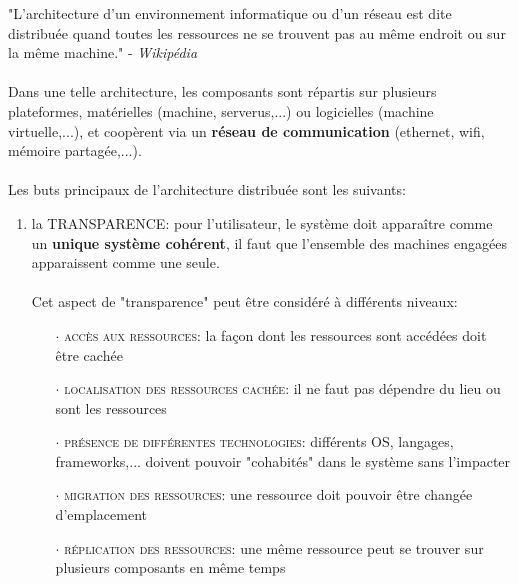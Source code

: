 \item{}
{"L’architecture d'un environnement informatique ou d'un réseau est dite distribuée quand toutes les ressources ne se trouvent pas au même endroit ou sur la même machine." - \textit{Wikipédia}
\paragraph{}
Dans une telle architecture, les composants sont répartis sur plusieurs plateformes, matérielles (machine, serverus,...) ou logicielles (machine virtuelle,...), et coopèrent via un \textbf{réseau de communication} (ethernet, wifi, mémoire partagée,...).
\paragraph{}
Les buts principaux de l'architecture distribuée sont les suivants:
\begin{enumerate}\setlength{\itemsep}{.3em}
\item la TRANSPARENCE: pour l'utilisateur, le système doit apparaître comme un \textbf{unique système cohérent}, il faut que l'ensemble des machines engagées apparaissent comme une seule. \paragraph{}Cet aspect de "transparence" peut être considéré à différents niveaux:
	\begin{itemize}\setlength{\itemsep}{.2em}
	\item[$\cdot$] \textcolor{ltred}{\textsc{accès aux ressources}}: la façon dont les ressources sont accédées doit être cachée
	\item[$\cdot$] \textcolor{ltred}{\textsc{localisation des ressources cachée}}: il ne faut pas dépendre du lieu ou sont les ressources
	\item[$\cdot$] \textcolor{ltred}{\textsc{présence de différentes technologies}}: différents OS, langages, frameworks,... doivent pouvoir "cohabités" dans le système sans l'impacter
	\item[$\cdot$] \textcolor{ltred}{\textsc{migration des ressources}}: une ressource doit pouvoir être changée d'emplacement
	\item[$\cdot$] \textcolor{ltred}{\textsc{réplication des ressources}}: une même ressource peut se trouver sur plusieurs composants en même temps

\end{itemize}
\end{enumerate}}
